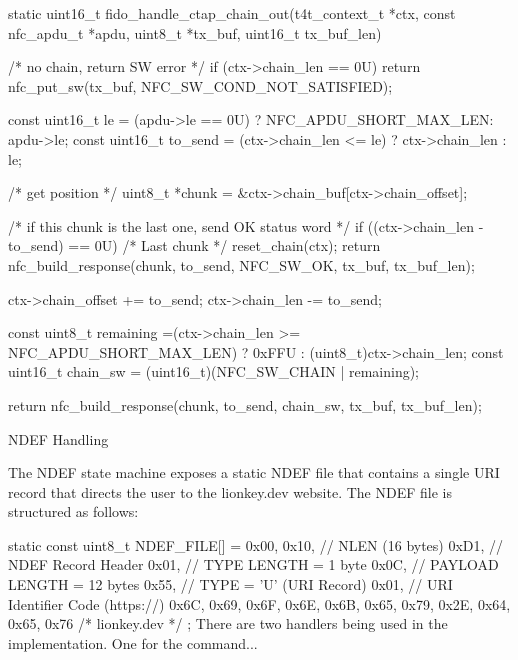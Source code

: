 \begtt
static uint16_t fido_handle_ctap_chain_out(t4t_context_t *ctx,
                                         const nfc_apdu_t *apdu,
                                         uint8_t *tx_buf, 
                                         uint16_t tx_buf_len)
{

    /* no chain, return SW error */
    if (ctx->chain_len == 0U)
    {
        return nfc_put_sw(tx_buf, NFC_SW_COND_NOT_SATISFIED);
    }

    const uint16_t le      = (apdu->le == 0U) ? 
                              NFC_APDU_SHORT_MAX_LEN: apdu->le;
    const uint16_t to_send = (ctx->chain_len <= le) ? 
                              ctx->chain_len : le;

    /* get position */
    uint8_t *chunk = &ctx->chain_buf[ctx->chain_offset];

    /* if this chunk is the last one, send OK status word */
    if ((ctx->chain_len - to_send) == 0U)
    {
        /* Last chunk */
        reset_chain(ctx);
        return nfc_build_response(chunk, 
                                  to_send, 
                                  NFC_SW_OK, 
                                  tx_buf, 
                                  tx_buf_len);
    }

    ctx->chain_offset += to_send;
    ctx->chain_len    -= to_send;

    const uint8_t remaining =(ctx->chain_len >= NFC_APDU_SHORT_MAX_LEN) ? 
                               0xFFU : (uint8_t)ctx->chain_len;
    const uint16_t chain_sw = (uint16_t)(NFC_SW_CHAIN | remaining);

    return nfc_build_response(chunk, 
                              to_send, 
                              chain_sw, 
                              tx_buf, 
                              tx_buf_len);
}
\endtt



 NDEF Handling

The NDEF state machine exposes a static NDEF file that contains a single URI record that directs the user to the lionkey.dev website. The NDEF file is structured as follows:

\begtt
static const uint8_t NDEF_FILE[] = {
0x00, 0x10, // NLEN (16 bytes)
0xD1, // NDEF Record Header
0x01, // TYPE LENGTH = 1 byte
0x0C, // PAYLOAD LENGTH = 12 bytes
0x55, // TYPE = 'U' (URI Record)
0x01, // URI Identifier Code (https://)
0x6C, 0x69, 0x6F, 0x6E, 0x6B, 0x65, 0x79, 0x2E, 0x64, 0x65, 0x76 
/* lionkey.dev */
};
\endtt
There are two handlers being used in the implementation. One for the  command...

